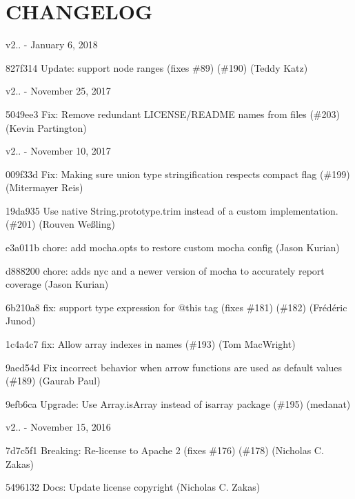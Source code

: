 \chapter{CHANGELOG}
\hypertarget{md_node__modules_2eslint-plugin-react_2node__modules_2doctrine_2_c_h_a_n_g_e_l_o_g}{}\label{md_node__modules_2eslint-plugin-react_2node__modules_2doctrine_2_c_h_a_n_g_e_l_o_g}
v2.. -\/ January 6, 2018


\begin{DoxyItemize}
\item 827f314 Update\+: support node ranges (fixes \#89) (\#190) (Teddy Katz)
\end{DoxyItemize}

v2.. -\/ November 25, 2017


\begin{DoxyItemize}
\item 5049ee3 Fix\+: Remove redundant LICENSE/\+README names from files (\#203) (Kevin Partington)
\end{DoxyItemize}

v2.. -\/ November 10, 2017


\begin{DoxyItemize}
\item 009f33d Fix\+: Making sure union type stringification respects compact flag (\#199) (Mitermayer Reis)
\item 19da935 Use native String.\+prototype.\+trim instead of a custom implementation. (\#201) (Rouven Weßling)
\item e3a011b chore\+: add mocha.\+opts to restore custom mocha config (Jason Kurian)
\item d888200 chore\+: adds nyc and a newer version of mocha to accurately report coverage (Jason Kurian)
\item 6b210a8 fix\+: support type expression for @this tag (fixes \#181) (\#182) (Frédéric Junod)
\item 1c4a4c7 fix\+: Allow array indexes in names (\#193) (Tom Mac\+Wright)
\item 9aed54d Fix incorrect behavior when arrow functions are used as default values (\#189) (Gaurab Paul)
\item 9efb6ca Upgrade\+: Use Array.\+is\+Array instead of isarray package (\#195) (medanat)
\end{DoxyItemize}

v2.. -\/ November 15, 2016


\begin{DoxyItemize}
\item 7d7c5f1 Breaking\+: Re-\/license to Apache 2 (fixes \#176) (\#178) (Nicholas C. Zakas)
\item 5496132 Docs\+: Update license copyright (Nicholas C. Zakas)
\end{DoxyItemize}

